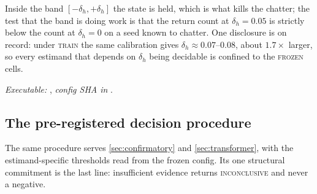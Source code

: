 \documentclass[11pt]{article}
\theoremstyle{definition}
\theoremstyle{remark}
\begin{document}
\noindent Inside the band $[-\delta_h,+\delta_h]$ the state is held, which is
what kills the chatter; the test that the band is doing work is that the return
count at $\delta_h=0.05$ is strictly below the count at $\delta_h=0$ on a seed
known to chatter. One disclosure is on record: under \textsc{train} the same
calibration gives $\delta_h\approx0.07$--$0.08$, about $1.7\times$ larger, so
every estimand that depends on $\delta_h$ being decidable is confined to the
\textsc{frozen} cells.

{\sloppy\noindent\textit{Executable:} ,
\textit{config SHA in} .\par}

\subsection{The pre-registered decision procedure}\label{app:alg4}

The same procedure serves \cref{sec:confirmatory} and \cref{sec:transformer},
with the estimand-specific thresholds read from the frozen config. Its one
structural commitment is the last line: insufficient evidence returns
\textsc{inconclusive} and never a negative.
\end{document}
